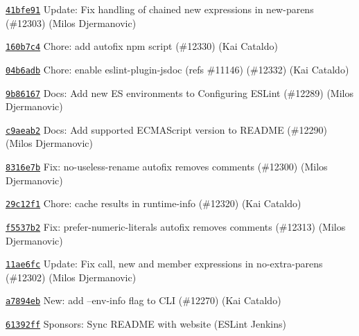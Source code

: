 \begin{DoxyItemize}
\item \href{https://github.com/eslint/eslint/commit/41bfe919c06932b7e58cd9ead20157e06656160a}{\texttt{ {\ttfamily 41bfe91}}} Update\+: Fix handling of chained new expressions in new-\/parens (\#12303) (Milos Djermanovic)
\item \href{https://github.com/eslint/eslint/commit/160b7c46b556ccb6023eb411a8be8801a4bda6df}{\texttt{ {\ttfamily 160b7c4}}} Chore\+: add autofix npm script (\#12330) (Kai Cataldo)
\item \href{https://github.com/eslint/eslint/commit/04b6adb7f1bcb2b6cb3fa377b1ca4cecd810630e}{\texttt{ {\ttfamily 04b6adb}}} Chore\+: enable eslint-\/plugin-\/jsdoc (refs \#11146) (\#12332) (Kai Cataldo)
\item \href{https://github.com/eslint/eslint/commit/9b86167e6f053e4a72bf68ebc79db53903f7f8c3}{\texttt{ {\ttfamily 9b86167}}} Docs\+: Add new ES environments to Configuring ESLint (\#12289) (Milos Djermanovic)
\item \href{https://github.com/eslint/eslint/commit/c9aeab21a71c6743f51163b7a8fdf4f0cbfcdbde}{\texttt{ {\ttfamily c9aeab2}}} Docs\+: Add supported ECMAScript version to README (\#12290) (Milos Djermanovic)
\item \href{https://github.com/eslint/eslint/commit/8316e7be5a9429513d7ecf2ee2afc40ab4415b8f}{\texttt{ {\ttfamily 8316e7b}}} Fix\+: no-\/useless-\/rename autofix removes comments (\#12300) (Milos Djermanovic)
\item \href{https://github.com/eslint/eslint/commit/29c12f18726a3afb21fc89ab1bdacc6972d49e68}{\texttt{ {\ttfamily 29c12f1}}} Chore\+: cache results in runtime-\/info (\#12320) (Kai Cataldo)
\item \href{https://github.com/eslint/eslint/commit/f5537b2ed0b0b5e51a34c22cdd4ebfd024eaea3d}{\texttt{ {\ttfamily f5537b2}}} Fix\+: prefer-\/numeric-\/literals autofix removes comments (\#12313) (Milos Djermanovic)
\item \href{https://github.com/eslint/eslint/commit/11ae6fcb5d5503e5dea41c02780369efe51f0bb9}{\texttt{ {\ttfamily 11ae6fc}}} Update\+: Fix call, new and member expressions in no-\/extra-\/parens (\#12302) (Milos Djermanovic)
\item \href{https://github.com/eslint/eslint/commit/a7894ebb43523152d36720efa770bb1fe8b58c07}{\texttt{ {\ttfamily a7894eb}}} New\+: add --env-\/info flag to CLI (\#12270) (Kai Cataldo)
\item \href{https://github.com/eslint/eslint/commit/61392ff5ec660bfc01ac2ff0e9660d259cf88fd6}{\texttt{ {\ttfamily 61392ff}}} Sponsors\+: Sync README with website (ESLint Jenkins)

\end{DoxyItemize}
